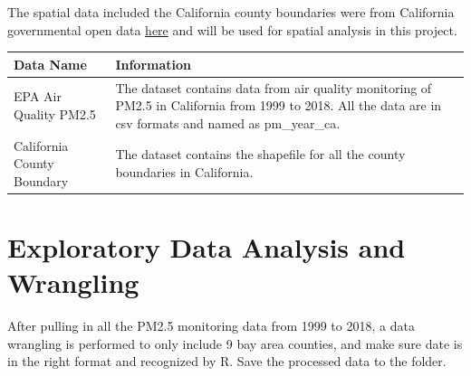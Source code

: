 \documentclass[12pt,]{article}
\begin{document}
The spatial data included the California county boundaries were from
California governmental open data
\href{https://data.ca.gov/dataset/ca-geographic-boundaries/resource/091ff50d-bb24-4537-a974-2ce89c6e8663}{here}
and will be used for spatial analysis in this project.

\begin{longtable}[]{@{}ll@{}}
\toprule
\begin{minipage}[b]{0.35\columnwidth}\raggedright\strut
Data Name\strut
\end{minipage} & \begin{minipage}[b]{0.56\columnwidth}\raggedright\strut
Information\strut
\end{minipage}\tabularnewline
\midrule
\endhead
\begin{minipage}[t]{0.35\columnwidth}\raggedright\strut
EPA Air Quality PM2.5\strut
\end{minipage} & \begin{minipage}[t]{0.56\columnwidth}\raggedright\strut
The dataset contains data from air quality monitoring of PM2.5 in
California from 1999 to 2018. All the data are in csv formats and named
as pm\_year\_ca.\strut
\end{minipage}\tabularnewline
\begin{minipage}[t]{0.35\columnwidth}\raggedright\strut
California County Boundary\strut
\end{minipage} & \begin{minipage}[t]{0.56\columnwidth}\raggedright\strut
The dataset contains the shapefile for all the county boundaries in
California.\strut
\end{minipage}\tabularnewline
\bottomrule
\end{longtable}

\newpage

\section{Exploratory Data Analysis and
Wrangling}\label{exploratory-data-analysis-and-wrangling}

After pulling in all the PM2.5 monitoring data from 1999 to 2018, a data
wrangling is performed to only include 9 bay area counties, and make
sure date is in the right format and recognized by R. Save the processed
data to the folder.
\end{document}
